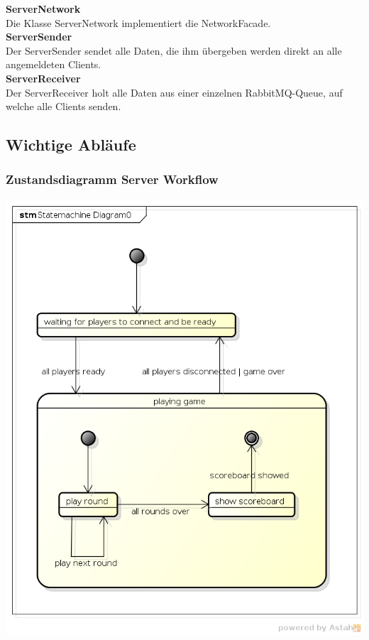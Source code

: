 \documentclass[11pt]{scrartcl}
\begin{document}
\textbf{ServerNetwork}\\
Die Klasse ServerNetwork implementiert die NetworkFacade.\\

\textbf{ServerSender}\\
Der ServerSender sendet alle Daten, die ihm übergeben werden direkt an alle angemeldeten Clients.\\

\textbf{ServerReceiver}\\
Der ServerReceiver holt alle Daten aus einer einzelnen RabbitMQ-Queue, auf welche alle Clients senden.\\

\newpage

\subsection{Wichtige Abläufe}
\subsubsection{Zustandsdiagramm Server Workflow}
\includegraphics[scale=0.7]{StatemachineServer}
\end{document}
